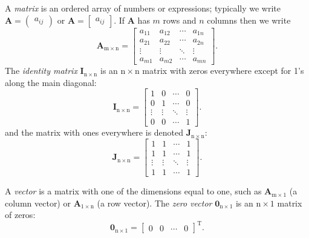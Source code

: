 \documentclass[captions=tableheading]{scrbook}
\begin{document}
\begin{example}
A \emph{matrix} is an ordered array of numbers or expressions; typically we write \(\mathbf{A}=\begin{pmatrix}a_{ij}\end{pmatrix}\) or \(\mathbf{A}=\begin{bmatrix}a_{ij}\end{bmatrix}\). If \(\mathbf{A}\) has \(m\) rows and \(n\) columns then we write
\begin{equation}
\mathbf{A}_{\mathrm{m}\times\mathrm{n}}=\begin{bmatrix}a_{11} & a_{12} & \cdots & a_{1n}\\
a_{21} & a_{22} & \cdots & a_{2n}\\
\vdots & \vdots & \ddots & \vdots\\
a_{m1} & a_{m2} & \cdots & a_{mn}\end{bmatrix}.
\end{equation}
The \emph{identity matrix} \(\mathbf{I}_{\mathrm{n}\times\mathrm{n}}\) is an \(\mathrm{n}\times\mathrm{n}\) matrix with zeros everywhere except for 1's along the main diagonal: 
\begin{equation}
\mathbf{I}_{\mathrm{n}\times\mathrm{n}}=\begin{bmatrix}1 & 0 & \cdots & 0\\
0 & 1 & \cdots & 0\\
\vdots & \vdots & \ddots & \vdots\\
0 & 0 & \cdots & 1\end{bmatrix}.
\end{equation}
and the matrix with ones everywhere is denoted \(\mathbf{J}_{\mathrm{n}\times\mathrm{n}}\):
\begin{equation}
\mathbf{J}_{\mathrm{n}\times\mathrm{n}}=\begin{bmatrix}1 & 1 & \cdots & 1\\
1 & 1 & \cdots & 1\\
\vdots & \vdots & \ddots & \vdots\\
1 & 1 & \cdots & 1\end{bmatrix}.
\end{equation}

A \emph{vector} is a matrix with one of the dimensions equal to one, such as \(\mathbf{A}_{\mathrm{m}\times1}\) (a column vector) or \(\mathbf{A}_{\mathrm{1}\times\mathrm{n}}\) (a row vector). The \emph{zero vector} \(\mathbf{0}_{\mathrm{n}\times1}\)
is an \(\mathrm{n}\times1\) matrix of zeros:
\begin{equation}
\mathbf{0}_{\mathrm{n}\times1}=\begin{bmatrix}0 & 0 & \cdots & 0\end{bmatrix}^{\mathrm{T}}.
\end{equation}


\end{example}
\end{document}
